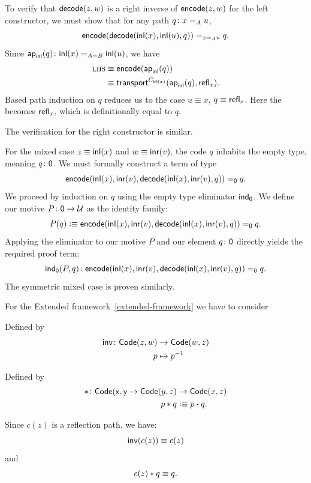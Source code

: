 \begin{description}[font=\normalfont\scshape]
    To verify that $\mathsf{decode}(z,w)$ is a right inverse of $\mathsf{encode}(z,w)$ for the left constructor, we must show that for any path $q\colon x\eq Au$,
    \[
        \mathsf{encode}(\mathsf{decode}(\mathsf{inl}(x),\mathsf{inl}(u),q))
            \mathrel{=_{x\mathrel{=_{A}}u}}q.
    \]
    Since $\fun{ap}_{\fun{inl}}(q)\colon\fun{inl}(x)\eq{A+B}\fun{inl}(u)$, we have
    \begin{align*}
       \textsc{lhs}&\equiv\mathsf{encode}(\mathsf{ap}_{\mathsf{inl}}(q))\\
            &\equiv
                \mathsf{transport}^{C_{\mathsf{inl}(x)}}
                    (\mathsf{ap}_{\mathsf{inl}}(q),\mathsf{refl}_x).
    \end{align*}
    Based path induction on $q$ reduces us to the case $u\equiv x$, $q\equiv\mathsf{refl}_x$. Here the \lhs becomes $\mathsf{refl}_x$, which is definitionally equal to $q$.
    
    The verification for the right constructor is similar.

    For the mixed case $z\equiv\mathsf{inl}(x)$ and $w\equiv\mathsf{inr}(v)$, the code $q$ inhabits the empty type, meaning $q\colon\fun0$. We must formally construct a term of type
    \[
        \mathsf{encode}(\mathsf{inl}(x),\mathsf{inr}(v),\mathsf{decode}(\mathsf{inl}(x),\mathsf{inr}(v),q))\mathrel{=_{\mathsf{0}}}q.
    \]
    We proceed by induction on $q$ using the empty type eliminator $\mathsf{ind}_{\mathsf{0}}$. We define our motive $P\colon\fun0\to\univ$ as the identity family:
    \[
        P(q)\mathrel{\vcentcolon}\equiv
            \mathsf{encode}(\mathsf{inl}(x),\mathsf{inr}
            (v),\mathsf{decode}(\mathsf{inl}(x),\mathsf{inr}(v),q))
            \mathrel{=_{\mathsf{0}}}
            q.
    \]
    Applying the eliminator to our motive $P$ and our element $q\colon\fun0$ directly yields the required proof term:
    \[
        \fun{ind}_{\fun0}(P,q)\colon
            \fun{encode}(\fun{inl}(x),
                \fun{inr}(v),
                \fun{decode}(\fun{inl}(x),
                \fun{inr}(v)
                ,q))
            \eq{\fun0}q.
    \]
    The symmetric mixed case is proven similarly.
\end{description}

For the Extended framework~\ref{extended-framework} we have to consider
\begin{description}[font=\normalfont\scshape]
    \item[Inversion map:] Defined by
    \begin{align*}
        \fun{inv}\colon\fun{Code}(z,w)&\to\fun{Code}(w,z)\\
        p&\mapsto p^{-1}
    \end{align*}

    \item[Concatenation:] Defined by
    \begin{align*}
        \ect\colon\fun{Code(x,y}\to\fun{Code}(y,z)
            &\to\fun{Code}(x,z)\\
        p\ect q&\defeq p\ct q.
    \end{align*}

    \item[Unit laws:] Since $c(z)$ is a reflection path, we have:
    \[
        \mathsf{inv}(c(z))\equiv c(z)
    \]
    and
    \[
        c(z)\mathbin\ast q\equiv q.
    \]
\end{description}

